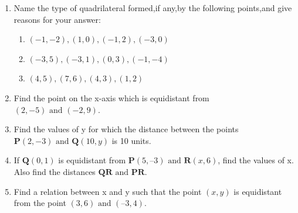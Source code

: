 \documentclass[12pt]{article}
\let\vec\mathbf
\begin{document}
\begin{enumerate}
\item Name the type of quadrilateral formed,if any,by the following points,and give reasons for your answer:
\begin{enumerate}
\item $(-1,-2),(1,0),(-1,2),(-3,0)$
\item $(-3,5),(-3,1),(0,3),(-1,-4)$
\item $(4,5),(7,6),(4,3),(1,2)$
\end{enumerate}
\item Find the point on the x-axis which is equidistant from $(2,-5)\text{ and }(-2,9)$.
\item Find the values of y for which the distance between the points                   $\vec{P}(2,-3) \text{ and }  \vec{Q}(10,y)$ is 10 units.
\item  If $\vec{Q}(0, 1)$ is equidistant from $\vec{P}(5, –3) \text{ and } \vec{R}(x, 6)$, find the values of x. Also find the distances $\vec{QR} \text{ and } \vec{PR}$.
\item  Find a relation between x and y such that the point $(x,y)$ is equidistant from the point
$(3, 6) \text{ and }  (– 3, 4)$.

\end{enumerate}
\end{document}
